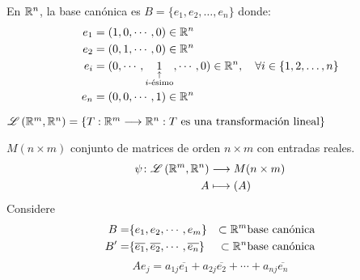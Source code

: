 En $\mathbb{R}^{n}$, la base canónica es $B = \{ e_1, e_2, \ldots, e_n \}$ donde:
\[
	\begin{aligned}
		e_1 & = (1,0,\cdots,0) \in \mathbb{R}^{n}                  \\
		e_2 & = (0,1,\cdots,0) \in \mathbb{R}^{n}                  \\
		e_i & = (0,\cdots, \underset{\substack{\uparrow \\ i\text{-ésimo}}}{1},\cdots,0) \in \mathbb{R}^{n}, \quad \forall i \in \{1,2,\ldots,n\} \\
		e_n & = (0,0,\cdots,1) \in \mathbb{R}^{n}
	\end{aligned}
\]


$\mathscr{L}\left( \mathbb{R}^{m}, \mathbb{R}^{n} \right) = \{T: \mathbb{R}^{m} \longrightarrow \mathbb{R}^{n} : T
	\text{ es una transformación lineal}\}$

$M(n\times m)$  conjunto de matrices de orden $n\times m $ con entradas reales.
\begin{align*}
	\psi \colon \mathscr{L}\left( \mathbb{R}^{m}, \mathbb{R}^{n} \right) & \longrightarrow M(n\times m) \\
	A                             & \longmapsto (A)
\end{align*}
Considere \begin{align*}
	B =  & \{ e_1, e_2, \cdots, e_m\}                                   & \subset \mathbb{R}^{m} \text{base canónica} \\
	B' = & \{ \overline{e_1} , \overline{e_2}, \cdots, \overline{e_n}\} & \subset \mathbb{R}^{n} \text{base canónica} \\
\end{align*}
$$
	Ae_j = a_{1j}\overline{e_1}+a_{2j}\overline{e_2}+\cdots+a_{nj}\overline{e_n}
$$

